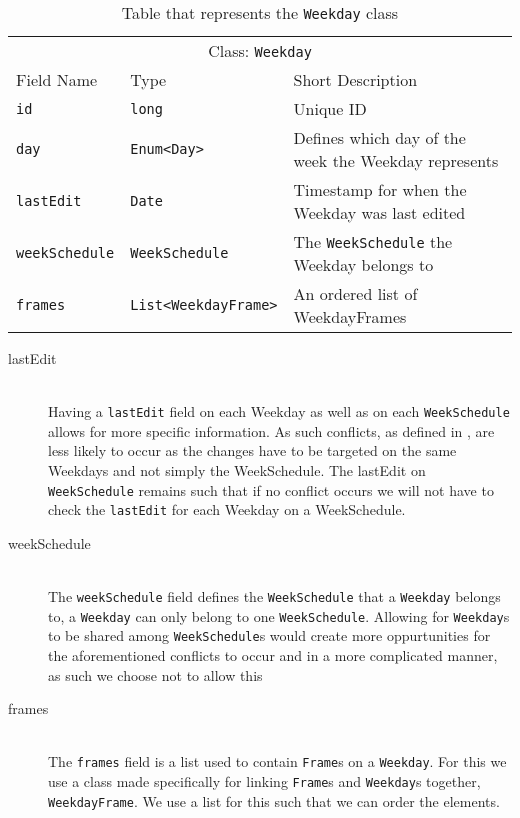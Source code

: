 \begin{table}[]
\centering
\caption{Table that represents the \texttt{Weekday} class}
\label{tbl:Weekday}
\begin{tabular}{lll}
\multicolumn{3}{c}{Class: \texttt{Weekday}}                                                                                    \\
Field Name            & Type                                            & Short Description                                    \\
\texttt{id}           & \texttt{long}                                   & Unique ID                                            \\
\texttt{day}          & \texttt{Enum\textless Day\textgreater}          & Defines which day of the week the Weekday represents \\
\texttt{lastEdit}     & \texttt{Date}                                   & Timestamp for when the Weekday was last edited       \\
\texttt{weekSchedule} & \texttt{WeekSchedule}                           & The \texttt{WeekSchedule} the Weekday belongs to     \\
\texttt{frames}       & \texttt{List\textless WeekdayFrame\textgreater} & An ordered list of WeekdayFrames 
\end{tabular}
\end{table}

\noindent
\begin{description}
    \item [lastEdit] \hfill \\
    Having a \texttt{lastEdit} field on each Weekday as well as on each \texttt{WeekSchedule} allows for more specific information. 
    As such conflicts, as defined in , are less likely to occur as the changes have to be targeted on the same Weekdays and not simply the WeekSchedule. 
    The lastEdit on \texttt{WeekSchedule} remains such that if no conflict occurs we will not have to check the \texttt{lastEdit} for each Weekday on a WeekSchedule.
    \item [weekSchedule] \hfill \\
    The \texttt{weekSchedule} field defines the \texttt{WeekSchedule} that a \texttt{Weekday} belongs to, a \texttt{Weekday} can only belong to one \texttt{WeekSchedule}.
    Allowing for \texttt{Weekday}s to be shared among \texttt{WeekSchedule}s would create more oppurtunities for the aforementioned conflicts to occur and in a more complicated manner, as such we choose not to allow this
    \item [frames] \hfill \\
    The \texttt{frames} field is a list used to contain \texttt{Frame}s on a \texttt{Weekday}.
    For this we use a class made specifically for linking \texttt{Frame}s and \texttt{Weekday}s together, \texttt{WeekdayFrame}.
    We use a list for this such that we can order the elements.
\end{description}

